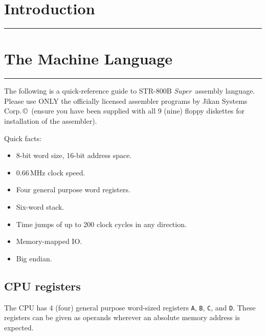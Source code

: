 \documentclass[a5paper,onecolumn,final,10pt]{memoir}
\newcommand\machinename%
	{\textsf{STR-800B \textit{Super}}}
\newcommand\companyname%
	{Jikan Systems Corp.\,\copyright}
\begin{document}
\mainmatter

\section{Introduction}
\vspace*{-20pt}\rule{\textwidth}{0.8pt}

\noindent



\clearpage
\section{The Machine Language}
\vspace*{-20pt}\rule{\textwidth}{0.8pt}

\noindent
The following is a quick-reference guide to \machinename\ assembly language. Please use ONLY the officially licensed assembler programs by \companyname\ (ensure you have been supplied with all 9 (nine) floppy diskettes for installation of the assembler).


Quick facts:
\begin{itemize}[nosep]
	\item 8-bit word size, 16-bit address space.
	\item 0.66\,MHz clock speed.
	\item Four general purpose word registers.
	\item Six-word stack.
	\item Time jumps of up to 200 clock cycles in any direction.\footnotemark
	\item Memory-mapped IO.
	\item Big endian.
\end{itemize}

\subsection*{CPU registers}

The CPU has 4 (four) general purpose word-sized registers \texttt{A}, \texttt{B}, \texttt{C}, and \texttt{D}.
These registers can be given as operands wherever an absolute memory address is expected.
\end{document}

